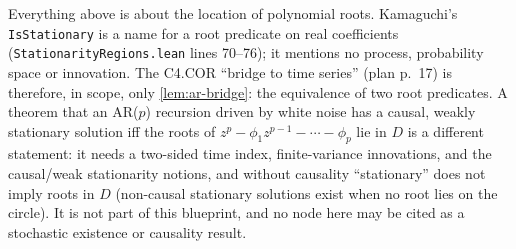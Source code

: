 \begin{remark}
Everything above is about the location of polynomial roots. Kamaguchi's
\texttt{IsStationary} is a name for a root predicate on real coefficients
(\texttt{StationarityRegions.lean} lines 70--76); it mentions no process,
probability space or innovation. The C4.COR ``bridge to time series'' (plan
p.~17) is therefore, in scope, only \ref{lem:ar-bridge}: the equivalence of two
root predicates. A theorem that an AR($p$) recursion driven by white noise has a
causal, weakly stationary solution iff the roots of
$z^p-\phi_1z^{p-1}-\cdots-\phi_p$ lie in $D$ is a different statement: it needs a
two-sided time index, finite-variance innovations, and the causal/weak
stationarity notions, and without causality ``stationary'' does not imply roots
in $D$ (non-causal stationary solutions exist when no root lies on the circle).
It is not part of this blueprint, and no node here may be cited as a stochastic
existence or causality result.
\end{remark}
